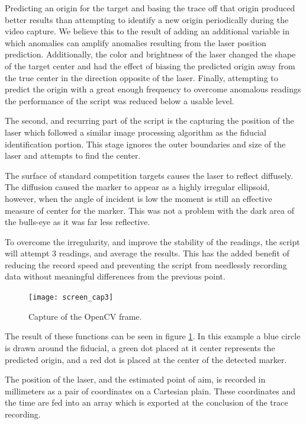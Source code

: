 \documentclass[conference]{IEEEtran}
\begin{document}
Predicting an origin for the target and basing the trace off that origin produced better results than attempting to identify a new origin periodically during the video capture.
We believe this to the result of adding an additional variable in which anomalies can amplify anomalies resulting from the laser position prediction. 
Additionally, the color and brightness of the laser changed the shape of the target center and had the effect of biasing the predicted origin away from the true center in the direction opposite of the laser.
Finally, attempting to predict the origin with a great enough frequency to overcome anomalous readings the performance of the script was reduced below a usable level.

The second, and recurring part of the script is the capturing the position of the laser which followed a similar image processing algorithm as the fiducial identification portion.
This stage ignores the outer boundaries and size of the laser and attempts to find the center.

The surface of standard competition targets causes the laser to reflect diffusely.
The diffusion caused the marker to appear as a highly irregular ellipsoid,
however, when the angle of incident is low the moment is still an effective measure of center for the marker.
This was not a problem with the dark area of the bulls-eye as it was far less reflective.

To overcome the irregularity, and improve the stability of the readings, the script will attempt 3 readings, and average the results.
This has the added benefit of reducing the record speed and preventing the script from needlessly recording data without meaningful differences from the previous point.

\begin{figure}[]
	\centering
	\texttt{[image: screen\_cap3]}
	\caption{Capture of the OpenCV frame.}
	\label{fig:screen_cap}
\end{figure}

The result of these functions can be seen in figure \ref{fig:screen_cap}.
In this example a blue circle is drawn around the fiducial,
a green dot placed at it center represents the predicted origin, and
a red dot is placed at the center of the detected marker.

The position of the laser, and the estimated point of aim, is recorded in millimeters as a pair of coordinates on a Cartesian plain. 
These coordinates and the time are fed into an array which is exported at the conclusion of the trace recording.
\end{document}
